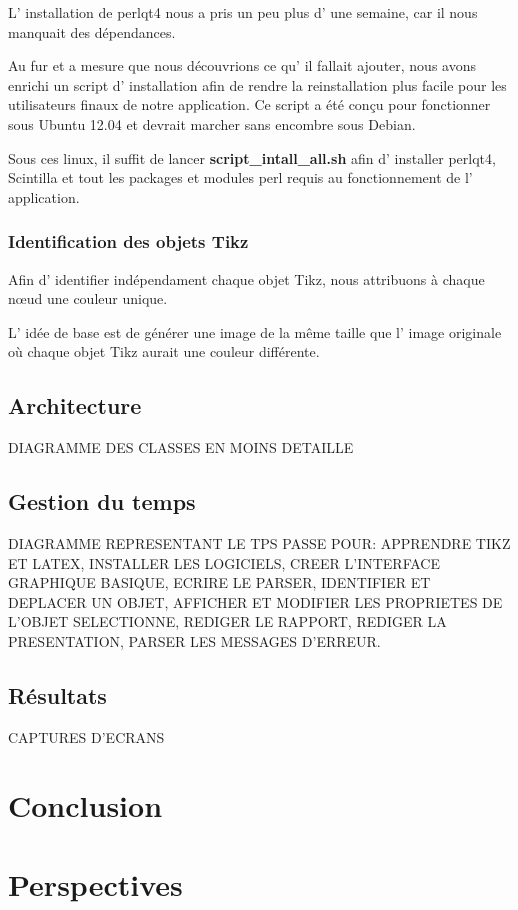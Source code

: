 \documentclass[a4paper]{report}
\begin{document}
L' installation de perlqt4 nous a pris un peu plus d' une semaine,
car il nous manquait des dépendances.

Au fur et a mesure que nous découvrions ce qu' il fallait ajouter,
nous avons enrichi un script d' installation afin de rendre la reinstallation
plus facile pour les utilisateurs finaux de notre application. Ce
script a été conçu pour fonctionner sous Ubuntu 12.04 et devrait marcher
sans encombre sous Debian.

Sous ces linux, il suffit de lancer \textbf{script\_intall\_all.sh}
afin d' installer perlqt4, Scintilla et tout les packages et modules
perl requis au fonctionnement de l' application.

\subsubsection{Identification des objets Tikz}

Afin d' identifier indépendament chaque objet Tikz, nous attribuons à chaque n{\oe}ud une couleur unique.

L' idée de base est de générer une image de la même taille que l'
image originale où chaque objet Tikz aurait une couleur différente. 
\subsection{Architecture}
  DIAGRAMME DES CLASSES EN MOINS DETAILLE   
\subsection{Gestion du temps}
  DIAGRAMME REPRESENTANT LE TPS PASSE POUR: APPRENDRE TIKZ ET LATEX, INSTALLER LES LOGICIELS, CREER L'INTERFACE GRAPHIQUE BASIQUE, ECRIRE LE PARSER, IDENTIFIER ET DEPLACER UN OBJET, AFFICHER ET MODIFIER LES PROPRIETES DE L'OBJET SELECTIONNE, REDIGER LE RAPPORT, REDIGER LA PRESENTATION, PARSER LES MESSAGES D'ERREUR.
\subsection{Résultats}
  CAPTURES D'ECRANS
\section{Conclusion}
\section{Perspectives}
   
\end{document}
